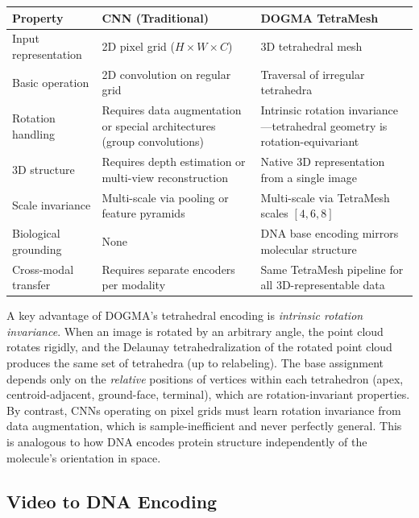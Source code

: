 \begin{center}
\renewcommand{\arraystretch}{1.15}
\begin{tabularx}{0.95\textwidth}{l Y Y}
\toprule
\textbf{Property} & \textbf{CNN (Traditional)} & \textbf{DOGMA TetraMesh} \\
\midrule
Input representation & 2D pixel grid ($H \times W \times C$) & 3D tetrahedral mesh \\
Basic operation & 2D convolution on regular grid & Traversal of irregular tetrahedra \\
Rotation handling & Requires data augmentation or special architectures (group convolutions) & Intrinsic rotation invariance---tetrahedral geometry is rotation-equivariant \\
3D structure & Requires depth estimation or multi-view reconstruction & Native 3D representation from a single image \\
Scale invariance & Multi-scale via pooling or feature pyramids & Multi-scale via TetraMesh scales $[4, 6, 8]$ \\
Biological grounding & None & DNA base encoding mirrors molecular structure \\
Cross-modal transfer & Requires separate encoders per modality & Same TetraMesh pipeline for all 3D-representable data \\
\bottomrule
\end{tabularx}
\label{tab:cv-comparison}
\end{center}

\begin{keyinsight}
A key advantage of DOGMA's tetrahedral encoding is \emph{intrinsic rotation invariance}. When an image is rotated by an arbitrary angle, the point cloud rotates rigidly, and the Delaunay tetrahedralization of the rotated point cloud produces the same set of tetrahedra (up to relabeling). The base assignment depends only on the \emph{relative} positions of vertices within each tetrahedron (apex, centroid-adjacent, ground-face, terminal), which are rotation-invariant properties. By contrast, CNNs operating on pixel grids must learn rotation invariance from data augmentation, which is sample-inefficient and never perfectly general. This is analogous to how DNA encodes protein structure independently of the molecule's orientation in space.
\end{keyinsight}

\subsection{Video to DNA Encoding}
\label{sec:video-to-dna}

